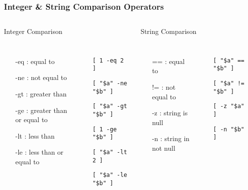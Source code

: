 \documentclass[slidestop,mathserif,compress,xcolor=svgnames]{beamer}
\newenvironment{eblock}[0]
{
\begin{beamerboxesrounded}[upper=uppercol2,lower=lowercol2,shadow=true]}
{\end{beamerboxesrounded}}
\begin{document}
\begin{frame}
  \frametitle{\small Integer \& String Comparison Operators}
  \vspace{-0.5cm}
  \begin{columns}
    \column{11.5cm}
    \begin{eblock}{Integer Comparison}
      \begin{columns}
        \column{6cm}
        \begin{itemize}
          \item[-eq]: equal to
          \item[-ne]: not equal to
          \item[-gt]: greater than
          \item[-ge]: greater than or equal to
          \item[-lt]: less than
          \item[-le]: less than or equal to
        \end{itemize}
        \column{5cm}
        \begin{itemize}
          \item[] \texttt{[ 1 -eq 2 ]}
          \item[] \texttt{[ "\$a" -ne "\$b" ]}
          \item[] \texttt{[ "\$a" -gt "\$b" ]}
          \item[] \texttt{[ 1 -ge "\$b" ]}
          \item[] \texttt{[ "\$a" -lt 2 ]}
          \item[] \texttt{[ "\$a" -le "\$b" ]}
        \end{itemize}
      \end{columns}
    \end{eblock}
    \begin{eblock}{String Comparison}
      \begin{columns}
        \column{6cm}
        \begin{itemize}
          \item[==]: equal to
          \item[!=]: not equal to
          \item[-z]: string is null
          \item[-n]: string in not null
        \end{itemize}
        \column{5cm}
        \begin{itemize}
          \item[] \texttt{[ "\$a" == "\$b" ]}
          \item[] \texttt{[ "\$a" != "\$b" ]}
          \item[] \texttt{[ -z "\$a" ]}
          \item[] \texttt{[ -n "\$b" ]}
        \end{itemize}
      \end{columns}
    \end{eblock}
  \end{columns}
\end{frame}
\end{document}
